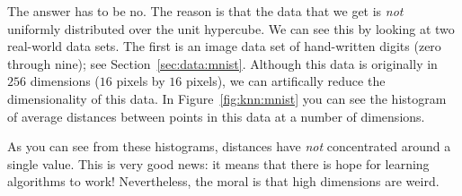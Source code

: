 
The answer has to be no.  The reason is that the data that we get is
\emph{not} uniformly distributed over the unit hypercube.  We can see
this by looking at two real-world data sets.  The first is an image
data set of hand-written digits (zero through nine); see
Section~\ref{sec:data:mnist}.  Although this data is originally in
$256$ dimensions ($16$ pixels by $16$ pixels), we can artifically
reduce the dimensionality of this data.  In Figure~\ref{fig:knn:mnist}
you can see the histogram of average distances between points in this
data at a number of dimensions.

As you can see from these histograms, distances have \emph{not}
concentrated around a single value.  This is very good news: it means
that there is hope for learning algorithms to work!  Nevertheless, the
moral is that high dimensions are weird.








